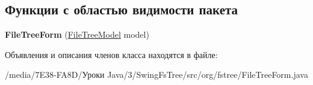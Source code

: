 \subsection*{Функции с областью видимости пакета}
\begin{DoxyCompactItemize}
\item 
\hypertarget{classorg_1_1fstree_1_1_file_tree_form_af2d0eb52e94d2bb70b0edfc1be02b6c5}{
{\bfseries FileTreeForm} (\hyperlink{classorg_1_1fstree_1_1_file_tree_model}{FileTreeModel} model)}
\label{classorg_1_1fstree_1_1_file_tree_form_af2d0eb52e94d2bb70b0edfc1be02b6c5}

\end{DoxyCompactItemize}


Объявления и описания членов класса находятся в файле:\begin{DoxyCompactItemize}
\item 
/media/7E38-\/FA8D/Уроки Java/3/SwingFsTree/src/org/fstree/FileTreeForm.java\end{DoxyCompactItemize}
